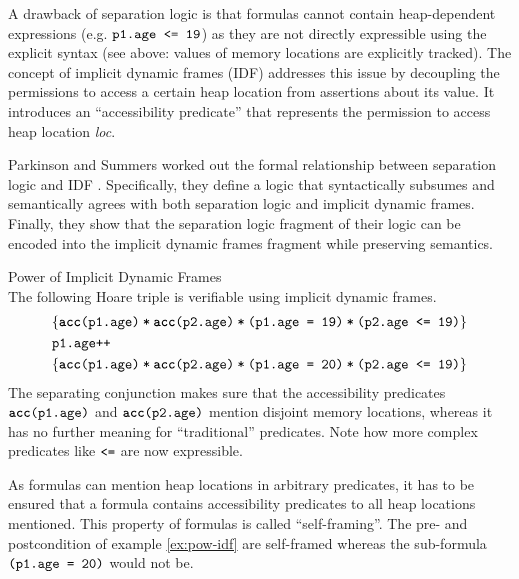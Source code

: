 A drawback of separation logic is that formulas cannot contain heap-dependent expressions (e.g. $\textup{\texttt{p1.age <= 19}}$) as they are not directly expressible using the explicit syntax (see above: values of memory locations are explicitly tracked).
The concept of implicit dynamic frames (IDF) \cite{smans2009implicit} addresses this issue by decoupling the permissions to access a certain heap location from assertions about its value.
It introduces an “accessibility predicate”  that represents the permission to access heap location \textit{loc}.

Parkinson and Summers worked out the formal relationship between separation logic and IDF \cite{parkinson2011relationship}.
Specifically, they define a logic that syntactically subsumes and semantically agrees with both separation logic and implicit dynamic frames.
Finally, they show that the separation logic fragment of their logic can be encoded into the implicit dynamic frames fragment while preserving semantics.

\begin{example}{Power of Implicit Dynamic Frames}~\\
    \label{ex:pow-idf}
    The following Hoare triple is verifiable using implicit dynamic frames.
    \begin{alignat*}{1}
    &\{\textup{\texttt{\textup{\texttt{\textup{\texttt{\textbf{acc}(p1.age)}}\:*\:\textup{\texttt{\textbf{acc}(p2.age)}}}}\:*\:\textup{\texttt{\textup{\texttt{(p1.age = 19)}}\:*\:\textup{\texttt{(p2.age <= 19)}}}}}}\}\\
    &{\textup{\texttt{p1.age++}}}\\
    &\{\textup{\texttt{\textup{\texttt{\textup{\texttt{\textbf{acc}(p1.age)}}\:*\:\textup{\texttt{\textbf{acc}(p2.age)}}}}\:*\:\textup{\texttt{\textup{\texttt{(p1.age = 20)}}\:*\:\textup{\texttt{(p2.age <= 19)}}}}}}\}
    \end{alignat*}
    The separating conjunction makes sure that the accessibility predicates $\textup{\texttt{\textbf{acc}(p1.age)}}$ and $\textup{\texttt{\textbf{acc}(p2.age)}}$ mention disjoint memory locations, whereas it has no further meaning for “traditional” predicates.
    Note how more complex predicates like $\textup{\texttt{<=}}$ are now expressible.
\end{example}

As formulas can mention heap locations in arbitrary predicates, it has to be ensured that a formula contains accessibility predicates to all heap locations mentioned.
This property of formulas is called “self-framing”.
The pre- and postcondition of example \ref{ex:pow-idf} are self-framed whereas the sub-formula $\textup{\texttt{(p1.age = 20)}}$ would not be.

